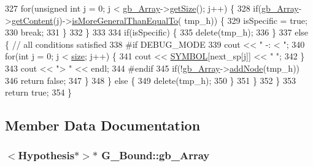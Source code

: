 \begin{DoxyCode}
327         \textcolor{keywordflow}{for}(\textcolor{keywordtype}{unsigned} \textcolor{keywordtype}{int} j = 0; j < \hyperlink{class_g___bound_ac6492431679144fc64b83228f12c0c1a}{gb\_Array}->\hyperlink{class_list_a4d8d3acaf718d470e1084814a6155814}{getSize}(); j++) \{
328           \textcolor{keywordflow}{if}(\hyperlink{class_g___bound_ac6492431679144fc64b83228f12c0c1a}{gb\_Array}->\hyperlink{class_list_aa93404b4c7f3f86a560a0a675f55c9bd}{getContent}(j)->\hyperlink{class_hypothesis_ad0d80b24404c0398ef502740b5115f4a}{isMoreGeneralThanEqualTo}(
      tmp\_h)) \{
329             isSpecific = \textcolor{keyword}{true};
330             \textcolor{keywordflow}{break};
331           \}
332         \}
333         
334         \textcolor{keywordflow}{if}(isSpecific) \{
335           \textcolor{keyword}{delete}(tmp\_h);
336         \}
337         \textcolor{keywordflow}{else} \{  \textcolor{comment}{// all conditions satisfied}
338 \textcolor{preprocessor}{#if DEBUG\_MODE}
339 \textcolor{preprocessor}{}          cout << \textcolor{stringliteral}{" -: < "};
340           \textcolor{keywordflow}{for}(\textcolor{keywordtype}{int} j = 0; j < \hyperlink{class_g___bound_a2583e4243c89d01b3131ce8fb40940a9}{size}; j++) \{
341             cout << \hyperlink{concept_8cpp_a6a0fcd5aed2dc21ce5f79cbe7c3a8e2f}{SYMBOL}[next\_sp[j]] << \textcolor{stringliteral}{" "};
342           \}
343           cout << \textcolor{stringliteral}{"> "} << endl;
344 \textcolor{preprocessor}{#endif}
345 \textcolor{preprocessor}{}          \textcolor{keywordflow}{if}(!\hyperlink{class_g___bound_ac6492431679144fc64b83228f12c0c1a}{gb\_Array}->\hyperlink{class_list_ac8fff7396766358cee488223009ac578}{addNode}(tmp\_h))
346             \textcolor{keywordflow}{return} \textcolor{keyword}{false};
347         \}
348       \} \textcolor{keywordflow}{else} \{
349         \textcolor{keyword}{delete}(tmp\_h);
350       \}
351     \}
352   \}
353   \textcolor{keywordflow}{return} \textcolor{keyword}{true};
354 \}
\end{DoxyCode}


\subsection{Member Data Documentation}
\hypertarget{class_g___bound_ac6492431679144fc64b83228f12c0c1a}{
\subsubsection[{gb\-\_\-\-Array}]{$<${\bf Hypothesis}$\ast$$>$$\ast$ G\-\_\-\-Bound\-::gb\-\_\-\-Array\hspace{0.3cm}{\ttfamily [private]}}}\label{class_g___bound_ac6492431679144fc64b83228f12c0c1a}


